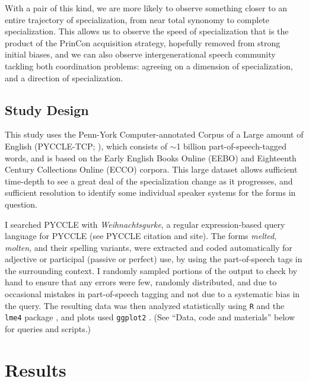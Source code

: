 \documentclass{artikel3}
\begin{document}
With a pair of this kind, we are more likely to observe something closer to an entire trajectory of specialization, from near total synonomy to complete specialization. This allows us to observe the speed of specialization that is the product of the PrinCon acquisition strategy, hopefully removed from strong initial biases, and we can also observe intergenerational speech community tackling both coordination problems: agreeing on a dimension of specialization, and a direction of specialization.

\subsection{Study Design}

This study uses the {P}enn-{Y}ork {C}omputer-annotated {C}orpus of a {L}arge amount of {E}nglish  (PYCCLE-TCP; \citealt{pyccle}), which consists of $\sim$1 billion part-of-speech-tagged words, and is based on the Early English Books Online (EEBO) and Eighteenth Century Collections Online (ECCO) corpora. This large dataset allows sufficient time-depth to see a great deal of the specialization change as it progresses, and sufficient resolution to identify some individual speaker systems for the forms in question.

I searched PYCCLE with \textsl{Weihnachtsgurke}, a regular expression-based query language for PYCCLE (see PYCCLE citation and site). The forms \textsl{melted}, \textsl{molten}, and their spelling variants, were extracted and coded automatically for adjective or participal (passive or perfect) use, by using the part-of-speech tags in the surrounding context. I randomly sampled portions of the output to check by hand to ensure that any errors were few, randomly distributed, and due to occasional mistakes in part-of-speech tagging and not due to a systematic bias in the query. The resulting data was then analyzed statistically using \texttt{R} and the \texttt{lme4} package \citep{lme4}, and plots used \texttt{ggplot2} \citep{ggplot2}. (See ``Data, code and materials'' below for queries and scripts.)



\section{Results}
\label{results}
\end{document}
